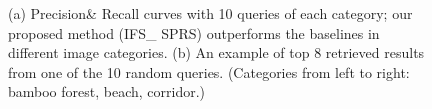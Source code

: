 \documentclass[letterpaper]{article}
\begin{document}
\begin{figure}[!ht]
\centering
{}


\label{The-result-of-the-retrieval}
\caption{(a) Precision\& Recall curves with 10 queries of each category; our proposed method (IFS\_ SPRS) outperforms the baselines in different image categories. (b) An example of top 8 retrieved results from one of the 10 random queries. (Categories from left to right: bamboo forest, beach, corridor.)}
\end{figure}
\end{document}
